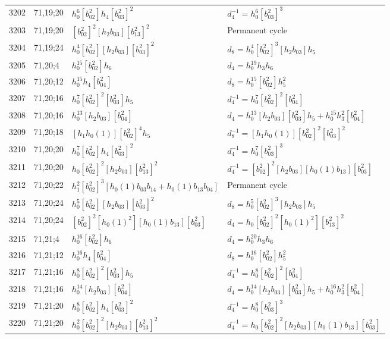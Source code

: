 \documentclass{article}
\begin{document}
\begin{longtable}{|l|l|>{\raggedright\arraybackslash}p{6cm}|>{\raggedright\arraybackslash}p{6cm}|}
\hline
3202 & 71,19;20 & $h_0^6[b_{02}^2]h_4[b_{03}^2]^2$ & $d_{4}^{-1}=h_0^6[b_{03}^2]^3$\\
3203 & 71,19;20 & $[b_{02}^2]^2[h_2b_{03}][b_{13}^2]^2$ & Permanent cycle\\
\hline
3204 & 71,19;24 & $h_0^4[b_{02}^2][h_2b_{03}][b_{03}^2]^2$ &$d_{8}=h_0^4[b_{02}^2]^3[h_2b_{03}]h_5$\\
\hline
3205 & 71,20;4 & $h_0^{15}[b_{02}^2]h_6$ &$d_{4}=h_0^{19}h_3h_6$\\
\hline
3206 & 71,20;12 & $h_0^{15}h_4[b_{04}^2]$ &$d_{8}=h_0^{15}[b_{02}^2]h_5^2$\\
\hline
3207 & 71,20;16 & $h_0^7[b_{02}^2]^2[b_{03}^2]h_5$ & $d_{4}^{-1}=h_0^7[b_{02}^2]^2[b_{04}^2]$\\
3208 & 71,20;16 & $h_0^{13}[h_2b_{03}][b_{04}^2]$ &$d_{4}=h_0^{13}[h_2b_{03}][b_{03}^2]h_5 + h_0^{15}h_3^2[b_{04}^2]$\\
\hline
3209 & 71,20;18 & $[h_1h_0(1)][b_{02}^2]^4h_5$ & $d_{8}^{-1}=[h_1h_0(1)][b_{02}^2]^2[b_{03}^2]^2$\\
\hline
3210 & 71,20;20 & $h_0^7[b_{02}^2]h_4[b_{03}^2]^2$ & $d_{4}^{-1}=h_0^7[b_{03}^2]^3$\\
3211 & 71,20;20 & $h_0[b_{02}^2]^2[h_2b_{03}][b_{13}^2]^2$ & $d_{4}^{-1}=[b_{02}^2]^2[h_2b_{03}][h_0(1)b_{13}][b_{03}^2]$\\
\hline
3212 & 71,20;22 & $h_1^2[b_{02}^2]^3[h_0(1)b_{03}b_{14} + h_0(1)b_{13}b_{04}]$ & Permanent cycle\\
\hline
3213 & 71,20;24 & $h_0^5[b_{02}^2][h_2b_{03}][b_{03}^2]^2$ &$d_{8}=h_0^5[b_{02}^2]^3[h_2b_{03}]h_5$\\
3214 & 71,20;24 & $[b_{02}^2]^2[h_0(1)^2][h_0(1)b_{13}][b_{03}^2]$ &$d_{4}=h_0[b_{02}^2]^2[h_0(1)^2][b_{13}^2]^2$\\
\hline
3215 & 71,21;4 & $h_0^{16}[b_{02}^2]h_6$ &$d_{4}=h_0^{20}h_3h_6$\\
\hline
3216 & 71,21;12 & $h_0^{16}h_4[b_{04}^2]$ &$d_{8}=h_0^{16}[b_{02}^2]h_5^2$\\
\hline
3217 & 71,21;16 & $h_0^8[b_{02}^2]^2[b_{03}^2]h_5$ & $d_{4}^{-1}=h_0^8[b_{02}^2]^2[b_{04}^2]$\\
3218 & 71,21;16 & $h_0^{14}[h_2b_{03}][b_{04}^2]$ &$d_{4}=h_0^{14}[h_2b_{03}][b_{03}^2]h_5 + h_0^{16}h_3^2[b_{04}^2]$\\
\hline
3219 & 71,21;20 & $h_0^8[b_{02}^2]h_4[b_{03}^2]^2$ & $d_{4}^{-1}=h_0^8[b_{03}^2]^3$\\
3220 & 71,21;20 & $h_0^2[b_{02}^2]^2[h_2b_{03}][b_{13}^2]^2$ & $d_{4}^{-1}=h_0[b_{02}^2]^2[h_2b_{03}][h_0(1)b_{13}][b_{03}^2]$\\

\end{longtable}
\end{document}
